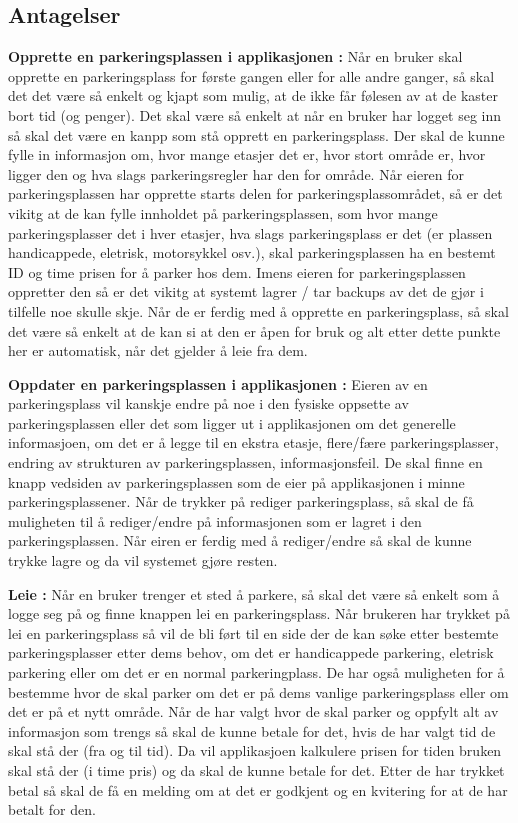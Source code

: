 \documentclass[12pt]{article}
\begin{document}
    \subsection{Antagelser}
    \textbf{Opprette en parkeringsplassen i applikasjonen :} Når en bruker skal opprette en parkeringsplass for første gangen eller for alle andre ganger, så skal det det være så enkelt og kjapt som mulig, at de ikke får følesen av at de kaster bort tid (og penger). Det skal være så enkelt at når en bruker har logget seg inn så skal det være en kanpp som stå opprett en parkeringsplass. Der skal de kunne fylle in informasjon om, hvor mange etasjer det er, hvor stort område er, hvor ligger den og hva slags parkeringsregler har den for område. Når eieren for parkeringsplassen har opprette starts delen for parkeringsplassområdet, så er det vikitg at de kan fylle innholdet på parkeringsplassen, som hvor mange parkeringsplasser det i hver etasjer, hva slags parkeringsplass er det (er plassen handicappede, eletrisk, motorsykkel osv.), skal parkeringsplassen ha en bestemt ID og time prisen for å parker hos dem. Imens eieren for parkeringsplassen oppretter den så er det vikitg at systemt lagrer / tar backups av det de gjør i tilfelle noe skulle skje. Når de er ferdig med å opprette en parkeringsplass, så skal det være så enkelt at de kan si at den er åpen for bruk og alt etter dette punkte her er automatisk, når det gjelder å leie fra dem.
    
    \textbf{Oppdater en parkeringsplassen i applikasjonen :} Eieren av en parkeringsplass vil kanskje endre på noe i den fysiske oppsette av parkeringsplassen eller det som ligger ut i applikasjonen om det generelle informasjoen, om det er å legge til en ekstra etasje, flere/fære parkeringsplasser, endring av strukturen av parkeringsplassen, informasjonsfeil. De skal finne en knapp vedsiden av parkeringsplassen som de eier på applikasjonen i minne parkeringsplassener. Når de trykker på rediger parkeringsplass, så skal de få muligheten til å rediger/endre på informasjonen som er lagret i den parkeringsplassen. Når eiren er ferdig med å rediger/endre så skal de kunne trykke lagre og da vil systemet gjøre resten.
    
    \textbf{Leie :} Når en bruker trenger et sted å parkere, så skal det være så enkelt som å logge seg på og finne knappen lei en parkeringsplass. Når brukeren har trykket på lei en parkeringsplass så vil de bli ført til en side der de kan søke etter bestemte parkeringsplasser etter dems behov, om det er handicappede parkering, eletrisk parkering eller om det er en normal parkeringplass. De har også muligheten for å bestemme hvor de skal parker om det er på dems vanlige parkeringsplass eller om det er på et nytt område. Når de har valgt hvor de skal parker og oppfylt alt av informasjon som trengs så skal de kunne betale for det, hvis de har valgt tid de skal stå der (fra og til tid). Da vil applikasjoen kalkulere prisen for tiden bruken skal stå der (i time pris) og da skal de kunne betale for det. Etter de har trykket betal så skal de få en melding om at det er godkjent og en kvitering for at de har betalt for den.
    
\end{document}
